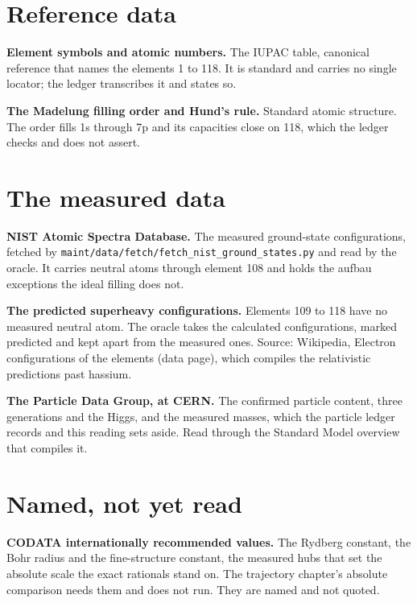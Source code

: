 \section*{Reference data}

\textbf{Element symbols and atomic numbers.} The IUPAC table, canonical reference that names the
elements 1 to 118. It is standard and carries no single locator; the ledger transcribes it and states
so.

\textbf{The Madelung filling order and Hund's rule.} Standard atomic structure. The order fills 1s
through 7p and its capacities close on 118, which the ledger checks and does not assert.

\section*{The measured data}

\textbf{NIST Atomic Spectra Database.} The measured ground-state configurations, fetched by
\texttt{maint/\allowbreak{}data/\allowbreak{}fetch/\allowbreak{}fetch\_nist\_ground\_states.py} and read
by the oracle. It carries neutral atoms through element 108 and holds the aufbau exceptions the ideal
filling does not.

\textbf{The predicted superheavy configurations.} Elements 109 to 118 have no measured neutral atom.
The oracle takes the calculated configurations, marked predicted and kept apart from the measured
ones.
Source: Wikipedia, Electron configurations of the elements (data page), which compiles the relativistic
predictions past hassium.

\textbf{The Particle Data Group, at CERN.} The confirmed particle content, three generations and the
Higgs, and the measured masses, which the particle ledger records and this reading sets aside. Read
through the Standard Model overview that compiles it.

\section*{Named, not yet read}

\textbf{CODATA internationally recommended values.} The Rydberg constant, the Bohr radius and the
fine-structure constant, the measured hubs that set the absolute scale the exact rationals stand on.
The trajectory chapter's absolute comparison needs them and does not run. They are named and not
quoted.
